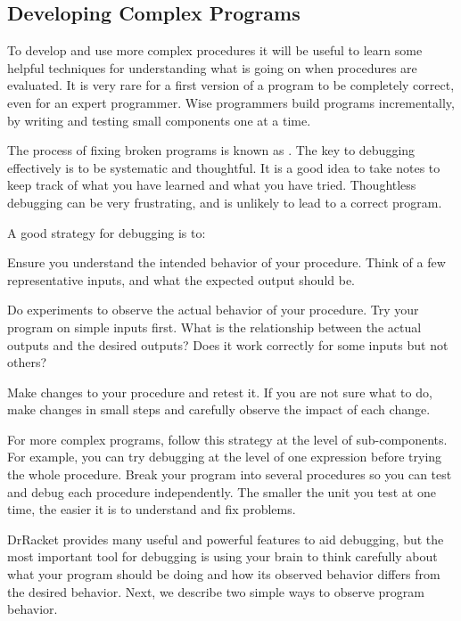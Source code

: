 \begin{schemeregion}
\section{Developing Complex Programs}
To develop and use more complex procedures it will be useful to learn some helpful techniques for understanding what is going on when procedures are evaluated.  It is very rare for a first version of a program to be completely correct, even for an expert programmer.  Wise programmers build programs incrementally, by writing and testing small components one at a time.

The process of fixing broken programs is known as .  The key to debugging effectively is to be systematic and thoughtful.  It is a good idea to take notes to keep track of what you have learned and what you have tried.  Thoughtless debugging can be very frustrating, and is unlikely to lead to a correct program.  

A good strategy for debugging is to:
\begin{enumtight}
\item Ensure you understand the intended behavior of your procedure.  Think of a few representative inputs, and what the expected output should be.
\item Do experiments to observe the actual behavior of your procedure.  Try your program on simple inputs first.  What is the relationship between the actual outputs and the desired outputs?  Does it work correctly for some inputs but not others?  
\item Make changes to your procedure and retest it.  If you are not sure what to do, make changes in small steps and carefully observe the impact of each change.  
\end{enumtight}

For more complex programs, follow this strategy at the level of sub-com\-po\-nents.  For example, you can try debugging at the level of one expression before trying the whole procedure.  Break your program into several procedures so you can test and debug each procedure independently.  The smaller the unit you test at one time, the easier it is to understand and fix problems. 

DrRacket provides many useful and powerful features to aid debugging, but the most important tool for debugging is using your brain to think carefully about what your program should be doing and how its observed behavior differs from the desired behavior.  Next, we describe two simple ways to observe program behavior.


\end{schemeregion}
